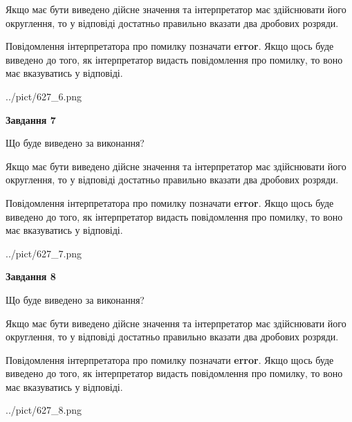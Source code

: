 \documentclass[12pt, ukrainian]{article}
\begin{document}
{\begin {Large}
Якщо має бути виведено дійсне значення та інтерпретатор має здійснювати його округлення, 
то у відповіді достатньо правильно вказати два дробових розряди.

Повідомлення інтерпретатора про помилку позначати \textbf{error}.
Якщо щось буде виведено до того, як інтерпретатор видасть повідомлення про помилку, 
то воно має вказуватись у відповіді. \par

\begin{center}
	{../pict/627_6.png}
\end{center}
\newpage

{\begin {center}\textbf{Завдання 7}\end {center}}\par
Що буде виведено за виконання? \par

Якщо має бути виведено дійсне значення та інтерпретатор має здійснювати його округлення, 
то у відповіді достатньо правильно вказати два дробових розряди.

Повідомлення інтерпретатора про помилку позначати \textbf{error}.
Якщо щось буде виведено до того, як інтерпретатор видасть повідомлення про помилку, 
то воно має вказуватись у відповіді. \par

\begin{center}
	{../pict/627_7.png}
\end{center}
\newpage

{\begin {center}\textbf{Завдання 8}\end {center}}\par
Що буде виведено за виконання? \par

Якщо має бути виведено дійсне значення та інтерпретатор має здійснювати його округлення, 
то у відповіді достатньо правильно вказати два дробових розряди.

Повідомлення інтерпретатора про помилку позначати \textbf{error}.
Якщо щось буде виведено до того, як інтерпретатор видасть повідомлення про помилку, 
то воно має вказуватись у відповіді. \par

\begin{center}
	{../pict/627_8.png}
\end{center}
\newpage


\end{Large}}
\end{document}
